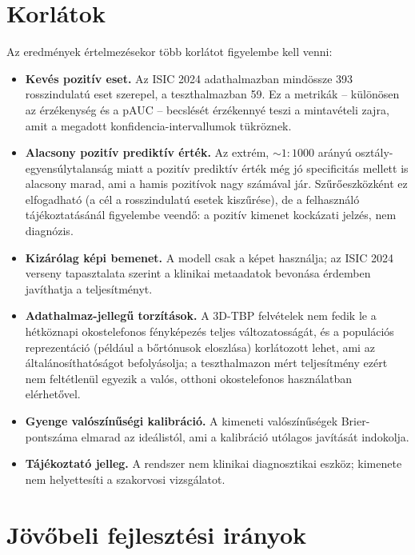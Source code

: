 \section{Korlátok}

Az eredmények értelmezésekor több korlátot figyelembe kell venni:

\begin{itemize}
  \item \textbf{Kevés pozitív eset.} Az ISIC 2024 adathalmazban mindössze 393
  rosszindulatú eset szerepel, a teszthalmazban 59. Ez a metrikák -- különösen
  az érzékenység és a pAUC -- becslését érzékennyé teszi a mintavételi zajra,
  amit a megadott konfidencia-intervallumok tükröznek.
  \item \textbf{Alacsony pozitív prediktív érték.} Az extrém, $\sim 1{:}1000$
  arányú osztály-egyensúlytalanság miatt a pozitív prediktív érték még jó
  specificitás mellett is alacsony marad, ami a hamis pozitívok nagy számával
  jár. Szűrőeszközként ez elfogadható (a cél a rosszindulatú esetek kiszűrése),
  de a felhasználó tájékoztatásánál figyelembe veendő: a pozitív kimenet
  kockázati jelzés, nem diagnózis.
  \item \textbf{Kizárólag képi bemenet.} A modell csak a képet használja; az ISIC
  2024 verseny tapasztalata szerint a klinikai metaadatok bevonása érdemben
  javíthatja a teljesítményt.
  \item \textbf{Adathalmaz-jellegű torzítások.} A 3D-TBP felvételek nem fedik le a
  hétköznapi okostelefonos fényképezés teljes változatosságát, és a populációs
  reprezentáció (például a bőrtónusok eloszlása) korlátozott lehet, ami az
  általánosíthatóságot befolyásolja; a teszthalmazon mért teljesítmény ezért nem
  feltétlenül egyezik a valós, otthoni okostelefonos használatban elérhetővel.
  \item \textbf{Gyenge valószínűségi kalibráció.} A kimeneti valószínűségek
  Brier-pontszáma elmarad az ideálistól, ami a kalibráció utólagos javítását
  indokolja.
  \item \textbf{Tájékoztató jelleg.} A rendszer nem klinikai diagnosztikai
  eszköz; kimenete nem helyettesíti a szakorvosi vizsgálatot.
\end{itemize}

\section{Jövőbeli fejlesztési irányok}

